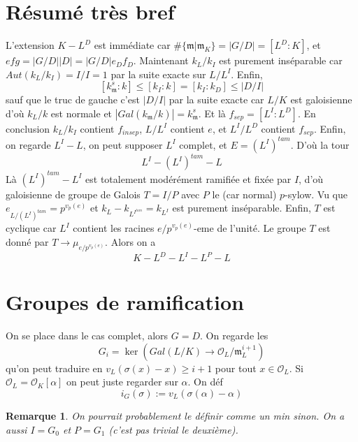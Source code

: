 \documentclass[a4paper,12pt]{book}
\newcommand{\Or}{\mathcal{O}}
\newcommand{\m}{\mathfrak m}
\theoremstyle{plain}
\newtheorem{rem}{Remarque}
\theoremstyle{definition}
\theoremstyle{remark}
\begin{document}
\section{Résumé très bref}
L'extension $K-L^D$ est immédiate car 
$\#\{\m|\m_K\}=|G/D|=[L^D:K]$, et $efg=|G/D||D|=|G/D|e_Df_D$.
Maintenant $k_L/k_I$ est purement inséparable car $Aut(k_L/k_I)=
I/I=1$ par la suite exacte sur $L/L^I$. Enfin, 
\[[k_\m^s:k]\leq [k_I:k]=[k_I:k_D]\leq |D/I|\]
sauf que le truc de gauche c'est $|D/I|$ par la suite exacte car
$L/K$ est galoisienne d'où $k_L/k$ est normale et 
$|Gal(k_\m/k)|=k_\m^s$. Et là $f_{sep}=[L^I:L^D]$. En conclusion
$k_L/k_I$ contient $f_{insep}$, $L/L^I$ contient
$e$, et $L^I/L^D$ contient $f_{sep}$. Enfin, on regarde $L^I-L$,
on peut supposer $L^I$ complet, et $E=(L^I)^{tam}$. D'où la tour
\[L^I-(L^I)^{tam}-L\]
Là $(L^I)^{tam}-L^I$ est totalement modérément ramifiée et
fixée par $I$, d'où galoisienne de groupe de Galois $T=I/P$ avec
$P$ le (car normal) $p$-sylow. Vu que 
$e_{L/(L^I)^{tam}}=p^{v_p(e)}$ et 
$k_L-k_{L^{I^{tam}}}=k_{L^I}$ est purement inséparable. Enfin,
$T$ est cyclique car $L^I$ contient les racines $e/p^{v_p(e)}$-eme
de l'unité. Le groupe $T$ est donné par $T\to \mu_{e/p^{v_p(e)}}$.
Alors on a
\[K-L^D-L^I-L^P-L\]

\section{Groupes de ramification}
On se place dans le cas complet, alors $G=D$.
On regarde les 
\[G_i=\ker(Gal(L/K)\to \Or_L/\m_L^{i+1})\]
qu'on peut traduire en $v_L(\sigma(x)-x)\geq i+1$ pour tout 
$x\in \Or_L$. Si $\Or_L=\Or_K[\alpha]$ on peut juste regarder
sur $\alpha$. On déf \[i_G(\sigma):=v_L(\sigma(\alpha)-\alpha)\]
\begin{rem}
    On pourrait probablement le définir comme un min sinon.
    On a aussi $I=G_0$ et $P=G_1$ (c'est pas trivial le deuxième).
\end{rem}
\end{document}
